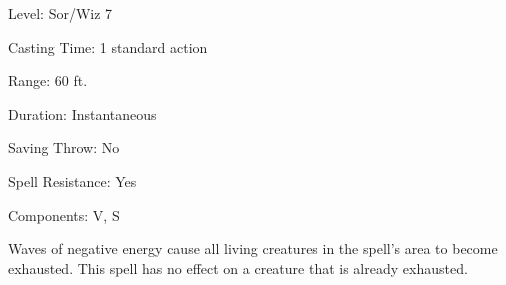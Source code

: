 
\begin{description*}
\item[Level:] Sor/Wiz 7
\item[Casting Time:] 1 standard action
\item[Range:] 60 ft.
\item[Duration:] Instantaneous
\item[Saving Throw:] No
\item[Spell Resistance:] Yes
\item[Components:] V, S
\end{description*}

Waves of negative energy cause all living creatures in the spell's area to become
exhausted. This spell has no effect on a creature that is already exhausted.
